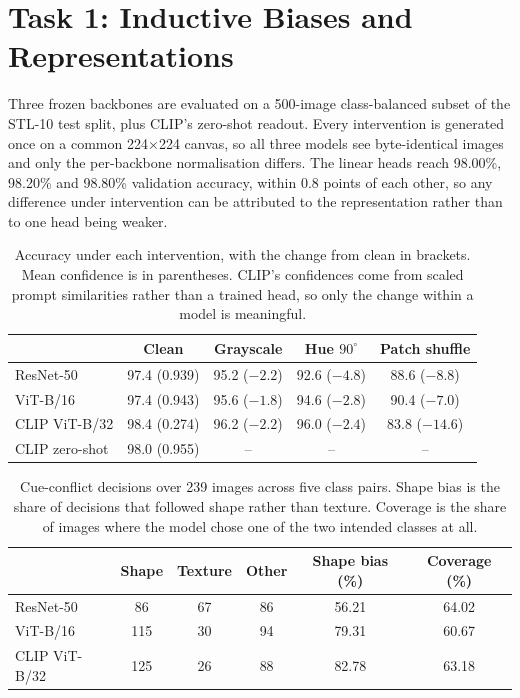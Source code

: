 \documentclass{article}
\begin{document}
\section{Task 1: Inductive Biases and Representations}
\label{sec:task1}

Three frozen backbones are evaluated on a 500-image class-balanced subset of
the STL-10 test split, plus CLIP's zero-shot readout. Every intervention is
generated once on a common 224$\times$224 canvas, so all three models see
byte-identical images and only the per-backbone normalisation differs. The
linear heads reach 98.00\%, 98.20\% and 98.80\% validation accuracy, within
0.8 points of each other, so any difference under intervention can be
attributed to the representation rather than to one head being weaker.

\begin{table}[t]
  \centering
  \caption{Accuracy under each intervention, with the change from clean in
  brackets. Mean confidence is in parentheses. CLIP's confidences come from
  scaled prompt similarities rather than a trained head, so only the change
  within a model is meaningful.}
  \label{tab:t1-interventions}
  \begin{tabular}{lcccc}
    \toprule
    & Clean & Grayscale & Hue $90^\circ$ & Patch shuffle \\
    \midrule
    ResNet-50     & 97.4 (0.939) & 95.2 ($-2.2$) & 92.6 ($-4.8$) & 88.6 ($-8.8$) \\
    ViT-B/16      & 97.4 (0.943) & 95.6 ($-1.8$) & 94.6 ($-2.8$) & 90.4 ($-7.0$) \\
    CLIP ViT-B/32 & 98.4 (0.274) & 96.2 ($-2.2$) & 96.0 ($-2.4$) & 83.8 ($-14.6$) \\
    \midrule
    CLIP zero-shot & 98.0 (0.955) & -- & -- & -- \\
    \bottomrule
  \end{tabular}
\end{table}

\begin{table}[t]
  \centering
  \caption{Cue-conflict decisions over 239 images across five class pairs.
  Shape bias is the share of decisions that followed shape rather than
  texture. Coverage is the share of images where the model chose one of the
  two intended classes at all.}
  \label{tab:t1-shapebias}
  \begin{tabular}{lccccc}
    \toprule
    & Shape & Texture & Other & Shape bias (\%) & Coverage (\%) \\
    \midrule
    ResNet-50     & 86  & 67 & 86 & 56.21 & 64.02 \\
    ViT-B/16      & 115 & 30 & 94 & 79.31 & 60.67 \\
    CLIP ViT-B/32 & 125 & 26 & 88 & 82.78 & 63.18 \\
    \bottomrule
  \end{tabular}
\end{table}
\end{document}
